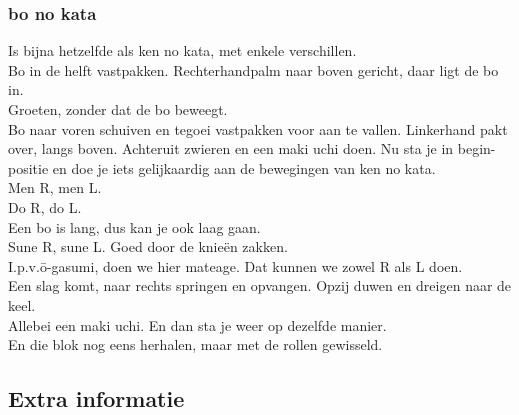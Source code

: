 \subsubsection{bo no kata}
Is bijna hetzelfde als ken no kata, met enkele verschillen.\\
Bo in de helft vastpakken. Rechterhandpalm naar boven gericht, daar ligt de bo in.\\
Groeten, zonder dat de bo beweegt.\\
Bo naar voren schuiven en tegoei vastpakken voor aan te vallen. Linkerhand pakt over, langs boven. Achteruit zwieren en een maki uchi doen. Nu sta je in begin-positie en doe je iets gelijkaardig aan de bewegingen van ken no kata.\\
Men R, men L.\\
Do R, do L.\\
Een bo is lang, dus kan je ook laag gaan.\\
Sune R, sune L. Goed door de knie\"{e}n zakken.\\
I.p.v.\={o}-gasumi, doen we hier mateage. Dat kunnen we zowel R als L doen.\\
Een slag komt, naar rechts springen en opvangen. Opzij duwen en dreigen naar de keel.\\
Allebei een maki uchi. En dan sta je weer op dezelfde manier.\\
En die blok nog eens herhalen, maar met de rollen gewisseld.

\subsection{Extra informatie}
